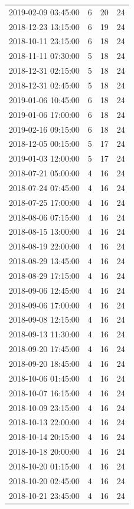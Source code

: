 \begin{tabular}{lrrr}
2019-02-09 03:45:00 & 6 & 20 & 24 \\
2018-12-23 13:15:00 & 6 & 19 & 24 \\
2018-10-11 23:15:00 & 6 & 18 & 24 \\
2018-11-11 07:30:00 & 5 & 18 & 24 \\
2018-12-31 02:15:00 & 5 & 18 & 24 \\
2018-12-31 02:45:00 & 5 & 18 & 24 \\
2019-01-06 10:45:00 & 6 & 18 & 24 \\
2019-01-06 17:00:00 & 6 & 18 & 24 \\
2019-02-16 09:15:00 & 6 & 18 & 24 \\
2018-12-05 00:15:00 & 5 & 17 & 24 \\
2019-01-03 12:00:00 & 5 & 17 & 24 \\
2018-07-21 05:00:00 & 4 & 16 & 24 \\
2018-07-24 07:45:00 & 4 & 16 & 24 \\
2018-07-25 17:00:00 & 4 & 16 & 24 \\
2018-08-06 07:15:00 & 4 & 16 & 24 \\
2018-08-15 13:00:00 & 4 & 16 & 24 \\
2018-08-19 22:00:00 & 4 & 16 & 24 \\
2018-08-29 13:45:00 & 4 & 16 & 24 \\
2018-08-29 17:15:00 & 4 & 16 & 24 \\
2018-09-06 12:45:00 & 4 & 16 & 24 \\
2018-09-06 17:00:00 & 4 & 16 & 24 \\
2018-09-08 12:15:00 & 4 & 16 & 24 \\
2018-09-13 11:30:00 & 4 & 16 & 24 \\
2018-09-20 17:45:00 & 4 & 16 & 24 \\
2018-09-20 18:45:00 & 4 & 16 & 24 \\
2018-10-06 01:45:00 & 4 & 16 & 24 \\
2018-10-07 16:15:00 & 4 & 16 & 24 \\
2018-10-09 23:15:00 & 4 & 16 & 24 \\
2018-10-13 22:00:00 & 4 & 16 & 24 \\
2018-10-14 20:15:00 & 4 & 16 & 24 \\
2018-10-18 20:00:00 & 4 & 16 & 24 \\
2018-10-20 01:15:00 & 4 & 16 & 24 \\
2018-10-20 02:45:00 & 4 & 16 & 24 \\
2018-10-21 23:45:00 & 4 & 16 & 24 \\

\end{tabular}
